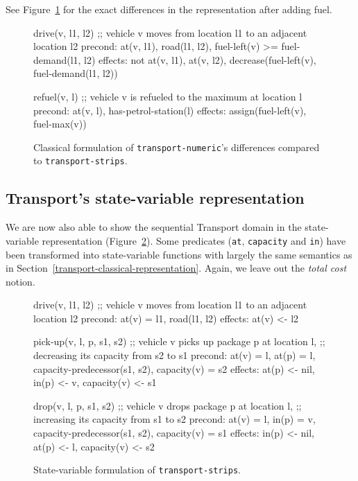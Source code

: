 See Figure~\ref{code:classical-numeric} for the exact differences
in the representation after adding fuel.

\begin{figure}[tb]
\begin{code}
drive(v, l1, l2)
  ;; vehicle v moves from location l1 to an adjacent location l2
  precond: at(v, l1), road(l1, l2), fuel-left(v) >= fuel-demand(l1, l2)
  effects: not at(v, l1), at(v, l2),
           decrease(fuel-left(v),  fuel-demand(l1, l2))
  
refuel(v, l)
  ;; vehicle v is refueled to the maximum at location l
  precond: at(v, l), has-petrol-station(l)
  effects: assign(fuel-left(v), fuel-max(v))
\end{code}
\caption{Classical formulation of \texttt{transport-numeric}'s differences compared to \texttt{transport-strips}.}
\label{code:classical-numeric}
\end{figure}


\subsection{Transport's state-variable representation}

We are now also able to show the sequential Transport domain
in the state-variable representation (Figure~\ref{code:statevar-strips}).
Some predicates (\verb+at+, \verb+capacity+ and \verb+in+) have been transformed
into state-variable functions with largely the same semantics as in
Section~\ref{transport-classical-representation}. Again, we leave out
the \textit{total cost} notion.

\begin{figure}[tb]
\begin{code}
drive(v, l1, l2)
  ;; vehicle v moves from location l1 to an adjacent location l2
  precond: at(v) = l1, road(l1, l2)
  effects: at(v) <- l2

pick-up(v, l, p, s1, s2)
  ;; vehicle v picks up package p at location l,
  ;; decreasing its capacity from s2 to s1
  precond: at(v) = l, at(p) = l, capacity-predecessor(s1, s2),
           capacity(v) = s2
  effects: at(p) <- nil, in(p) <- v, capacity(v) <- s1
  
drop(v, l, p, s1, s2)
  ;; vehicle v drops package p at location l,
  ;; increasing its capacity from s1 to s2
  precond: at(v) = l, in(p) = v, capacity-predecessor(s1, s2),
           capacity(v) = s1
  effects: in(p) <- nil, at(p) <- l, capacity(v) <- s2
\end{code}
\caption{State-variable formulation of \texttt{transport-strips}.}
\label{code:statevar-strips}
\end{figure}

